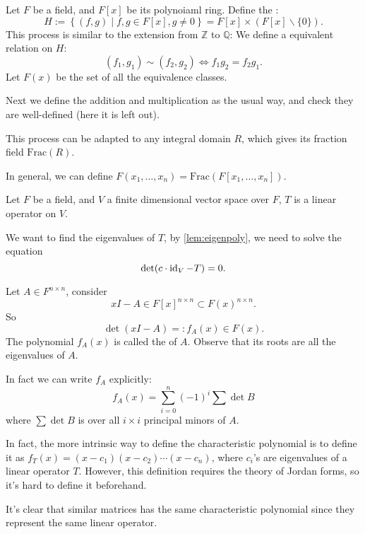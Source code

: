 \begin{definition}
	Let $F$ be a field, and $F[x]$ be its polynoiaml ring.
	Define the :
	\[
		H := \left\{(f,g)\mid f, g\in F[x], g\ne 0\right\}
		= F[x]\times (F[x]\backslash \{0\}).
	\]
	This process is similar to the extension from $\mathbb{Z}$ to $\mathbb{Q}$:
	We define a equivalent relation on $H$:
	\[
		(f_1,g_1)\sim(f_2,g_2)\iff f_1g_2=f_2g_1.
	\]
	Let $F(x)$ be the set of all the equivalence classes.

	Next we define the addition and multiplication as the usual way,
	and check they are well-defined (here it is left out).
\end{definition}
\begin{remark}
    This process can be adapted to any integral domain $R$,
	which gives its fraction field $\mathrm{Frac}(R)$.
\end{remark}

In general, we can define $F(x_1,\dots,x_n)= \mathrm{Frac}(F[x_1,\dots,x_n])$.

Let $F$ be a field, and $V$ a finite dimensional vector space over $F$,
$T$ is a linear operator on $V$.

We want to find the eigenvalues of $T$, by \autoref{lem:eigenpoly},
we need to solve the equation
 \[
\det(c\cdot \operatorname{id}_V - T) = 0.
\]
\begin{definition}
	Let $A\in F^{n \times n}$, consider
	\[
		xI-A\in F[x]^{n \times n} \subset F(x)^{n \times n}.
	\]
	So
	\[
	\det(xI-A) =: f_A(x)\in F(x).
	\]
	The polynomial $f_A(x)$ is called the  of $A$.
	Observe that its roots are all the eigenvalues of $A$.

	In fact we can write  $f_A$ explicitly:
	\[
	f_A(x) = \sum_{i=0}^{n} (-1)^i\sum \det B
	\]
	where $\sum \det B$ is over all $i \times i$ principal minors of $A$.
\end{definition}
\begin{remark}
    In fact, the more intrinsic way to define the characteristic polynomial
	is to define it as $f_T(x)=(x-c_1)(x-c_2)\cdots(x-c_n)$, where
	$c_i$'s are eigenvalues of a linear operator $T$.
	However, this definition requires the theory of Jordan forms,
	so it's hard to define it beforehand.
\end{remark}

It's clear that similar matrices has the same characteristic polynomial
since they represent the same linear operator.

